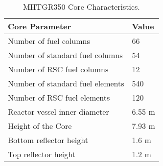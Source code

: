 \documentclass[11pt,letterpaper]{article}
\begin{document}
	\begin{table}[H]
		\centering
	    \caption{MHTGR350 Core Characteristics.}
	    \label{tab:ccharacteristics}
		\begin{tabular}{l|l}
		\hline
		Core Parameter                   & Value     \\ \hline
		Number of fuel columns           & 66        \\
		Number of standard fuel columns  & 54        \\
		Number of RSC fuel columns       & 12        \\
		Number of standard fuel elements & 540       \\
		Number of RSC fuel elements      & 120       \\
		Reactor vessel inner diameter    & 6.55 m    \\
		Height of the Core               & 7.93 m    \\
		Bottom reflector height          & 1.6 m     \\
		Top reflector height             & 1.2 m     \\ \hline
		\end{tabular}
	\end{table}

\pagebreak


\end{document}
